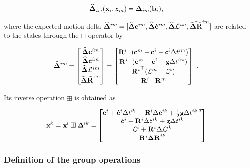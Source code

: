 \begin{equation}
    \widehat{{{\bm \Delta}}}_{im}({\bf x}_i, {\bf x}_m) = {{\bm \Delta}}_{im}({\bf b}_i),
\end{equation}

where the expected motion delta $\widehat{{{\bm \Delta}}}^{im} = [\widehat{{{\bm \Delta}}}{\bf c}^{im}, \widehat{{{\bm \Delta}}}\dot{{\bf c}}^{im}, \widehat{{{\bm \Delta}}}\mathcal{L}^{im}, \widehat{{\bm \Delta {\bf R}}}^{im}]$ are related to the states through the 
$\boxminus$ operator by


\begin{equation}
    \widehat{{{\bm \Delta}}}^{im} =
    \begin{bmatrix}
        \widehat{{{\bm \Delta}}}{\bf c}^{im} \\ \widehat{{{\bm \Delta}}}\dot{{\bf c}}^{im} \\ \widehat{{{\bm \Delta}}}\mathcal{L}^{im} \\ \widehat{{\bm \Delta {\bf R}}}^{im}
    \end{bmatrix}
    =
    \begin{bmatrix}
        {\prescript{}{}{{\bf R}}_{}^i}^{\top} ({\bf c}^m - {\bf c}^i - \dot{{\bf c}}^i \Delta t^{im})
        \\
        {\prescript{}{}{{\bf R}}_{}^i}^{\top} (\dot{{\bf c}}^{m} - \dot{{\bf c}}^{i} - {\bf g} \Delta t^{im})
        \\
        {\prescript{}{}{{\bf R}}_{}^i}^{\top} (\mathcal{L}^{m} - \mathcal{L}^{i})
        \\
        {\prescript{}{}{{\bf R}}_{}^i}^{\top} \prescript{}{}{{\bf R}}_{}^m
    \end{bmatrix}~.
    \label{eq:com_boxminus}
\end{equation}

Its inverse operation $\boxplus$ is obtained as

\begin{equation}
    {\bf x}^k = {\bf x}^i \boxplus {{\bm \Delta}}^{ik} =
    \begin{bmatrix}
    {\bf c}^i + \dot{{\bf c}}^i \Delta t^{ik} + \prescript{}{}{{\bf R}}_{}^i \Delta {\bf c}^{ik} + \frac{1}{2} {\bf g} \Delta t^{ik,2}
    \\
    \dot{{\bf c}}^i + \prescript{}{}{{\bf R}}_{}^i \Delta \dot{{\bf c}}^{ik} + {\bf g} \Delta t^{ik}
    \\
    \mathcal{L}^i + \prescript{}{}{{\bf R}}_{}^i \Delta \mathcal{L}^{ik}
    \\
    \prescript{}{}{{\bf R}}_{}^i {\bm \Delta {\bf R}}^{ik}
    \end{bmatrix}
\end{equation}


\subsubsection{Definition of the group operations}

